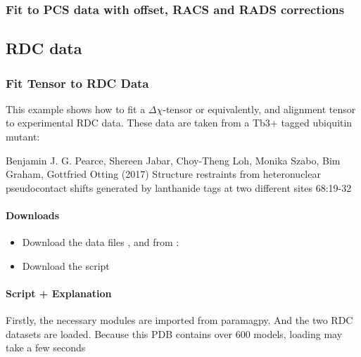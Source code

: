 \documentclass[a4paper,10pt,english,openany,oneside]{sphinxmanual}
\begin{document}
\subsubsection{Fit to PCS data with offset, RACS and RADS corrections}
\label{\detokenize{examples/pcs_fit_advanced_corrections:fit-to-pcs-data-with-offset-racs-and-rads-corrections}}\label{\detokenize{examples/pcs_fit_advanced_corrections:pcs-fit-advanced-corrections}}\label{\detokenize{examples/pcs_fit_advanced_corrections::doc}}

\subsection{RDC data}
\label{\detokenize{examples/index:rdc-data}}

\subsubsection{Fit Tensor to RDC Data}
\label{\detokenize{examples/rdc_fit:fit-tensor-to-rdc-data}}\label{\detokenize{examples/rdc_fit:rdc-fit}}\label{\detokenize{examples/rdc_fit::doc}}
This example shows how to fit a \({\Delta\chi}\)-tensor or equivalently, and alignment tensor to experimental RDC data. These data are taken from a Tb3+ tagged ubiquitin mutant:

Benjamin J. G. Pearce, Shereen Jabar, Choy-Theng Loh, Monika Szabo, Bim Graham, Gottfried Otting (2017) Structure restraints from heteronuclear pseudocontact shifts generated by lanthanide tags at two different sites  68:19-32


\paragraph{Downloads}
\label{\detokenize{examples/rdc_fit:downloads}}\begin{itemize}
\item {} 
Download the data files ,  and  from :

\item {} 
Download the script 

\end{itemize}


\paragraph{Script + Explanation}
\label{\detokenize{examples/rdc_fit:script-explanation}}
Firstly, the necessary modules are imported from paramagpy. And the two RDC datasets are loaded. Because this PDB contains over 600 models, loading may take a few seconds
\end{document}
